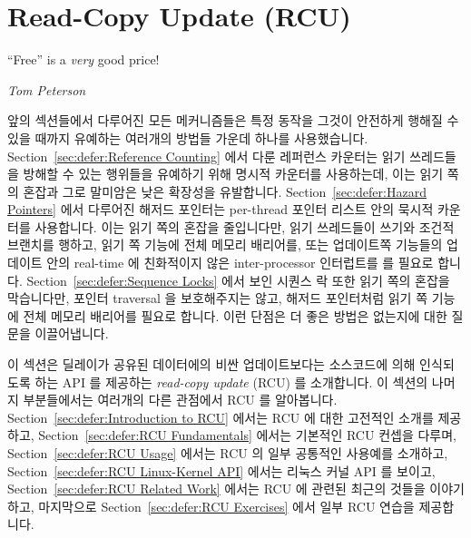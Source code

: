 
\section{Read-Copy Update (RCU)}
\label{sec:defer:Read-Copy Update (RCU)}
%
\epigraph{``Free'' is a \emph{very} good price!}{\emph{Tom Peterson}}

앞의 섹션들에서 다루어진 모든 메커니즘들은 특정 동작을 그것이 안전하게 행해질
수 있을 때까지 유예하는 여러개의 방법들 가운데 하나를 사용했습니다.
Section~\ref{sec:defer:Reference Counting} 에서 다룬 레퍼런스 카운터는 읽기
쓰레드들을 방해할 수 있는 행위들을 유예하기 위해 명시적 카운터를 사용하는데,
이는 읽기 쪽의 혼잡과 그로 말미암은 낮은 확장성을 유발합니다.
Section~\ref{sec:defer:Hazard Pointers} 에서 다루어진 해저드 포인터는
per-thread 포인터 리스트 안의 묵시적 카운터를 사용합니다.
이는 읽기 쪽의 혼잡을 줄입니다만, 읽기 쓰레드들이 쓰기와 조건적 브랜치를
행하고, 읽기 쪽 기능에 전체 메모리 배리어를, 또는 업데이트쪽 기능들의 업데이트
안의 real-time 에 친화적이지 않은 inter-processor 인터럽트를 를 필요로 합니다.
Section~\ref{sec:defer:Sequence Locks} 에서 보인 시퀀스 락 또한 읽기 쪽의
혼잡을 막습니다만, 포인터 traversal 을 보호해주지는 않고, 해저드 포인터처럼
읽기 쪽 기능에 전체 메모리 배리어를 필요로 합니다.
이런 단점은 더 좋은 방법은 없는지에 대한 질문을 이끌어냅니다.
\iffalse

All of the mechanisms discussed in the preceding sections
used one of a number of approaches to defer specific actions
until they may be carried out safely.
The reference counters discussed in
Section~\ref{sec:defer:Reference Counting}
use explicit counters to defer actions that could disturb readers,
which results in read-side contention and thus poor scalability.
The hazard pointers covered by
Section~\ref{sec:defer:Hazard Pointers}
uses implicit counters in the guise of per-thread lists of pointer.
This avoids read-side contention, but requires readers do stores and
conditional branches, as well as either full memory barriers in read-side
primitives or real-time-unfriendly inter-processor interrupts in updates
update-side primitives.
The sequence lock presented in
Section~\ref{sec:defer:Sequence Locks}
also avoids read-side contention, but does not protect pointer
traversals and, like hazard pointers, requires full memory barriers
in read-side primitives.
These schemes' shortcomings raise the question of
whether it is possible to do better.
\fi

이 섹션은 딜레이가 공유된 데이터에의 비싼 업데이트보다는 소스코드에 의해
인식되도록 하는 API 를 제공하는 \emph{read-copy update} (RCU) 를 소개합니다.
이 섹션의 나머지 부분들에서는 여러개의 다른 관점에서 RCU 를 알아봅니다.
Section~\ref{sec:defer:Introduction to RCU} 에서는 RCU 에 대한 고전적인 소개를
제공하고,
Section~\ref{sec:defer:RCU Fundamentals} 에서는 기본적인 RCU 컨셉을 다루며,
Section~\ref{sec:defer:RCU Usage} 에서는 RCU 의 일부 공통적인 사용예를
소개하고,
Section~\ref{sec:defer:RCU Linux-Kernel API} 에서는 리눅스 커널 API 를 보이고,
Section~\ref{sec:defer:RCU Related Work} 에서는 RCU 에 관련된 최근의 것들을
이야기하고, 마지막으로
Section~\ref{sec:defer:RCU Exercises} 에서 일부 RCU 연습을 제공합니다.
\iffalse


